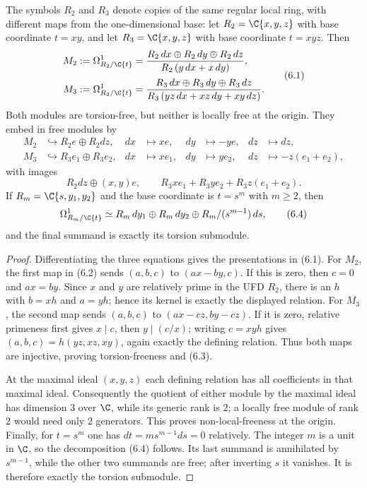 \begin{proposition}
\label{prop:relative-local}
The symbols $R_2$ and $R_3$ denote copies of the same regular local ring,
with different maps from the one-dimensional base:
let $R_2=\C\{x,y,z\}$ with base coordinate $t=xy$, and let
$R_3=\C\{x,y,z\}$ with base coordinate $t=xyz$.  Then
\[
\begin{aligned}
 M_2&:=\Omega^1_{R_2/\C\{t\}}
 =\frac{R_2\,dx\oplus R_2\,dy\oplus R_2\,dz}
        {R_2\,(y\,dx+x\,dy)},\\[2pt]
 M_3&:=\Omega^1_{R_3/\C\{t\}}
 =\frac{R_3\,dx\oplus R_3\,dy\oplus R_3\,dz}
        {R_3\,(yz\,dx+xz\,dy+xy\,dz)}.
\end{aligned}
\tag{6.1}
\]
Both modules are torsion-free, but neither is locally free at the origin.
They embed in free modules by
\[
\begin{aligned}
 M_2&\hookrightarrow R_2e\oplus R_2dz,
 &dx&\longmapsto xe,&dy&\longmapsto-ye,&dz&\longmapsto dz,\\
 M_3&\hookrightarrow R_3e_1\oplus R_3e_2,
 &dx&\longmapsto xe_1,&dy&\longmapsto ye_2,&dz&\longmapsto-z(e_1+e_2),
\end{aligned}
\tag{6.2}
\]
with images
\[
 R_2dz\oplus (x,y)e,
 \qquad
 R_3xe_1+R_3ye_2+R_3z(e_1+e_2).
\tag{6.3}
\]
If $R_m=\C\{s,y_1,y_2\}$ and the base coordinate is $t=s^m$ with
$m\ge2$, then
\[
\Omega^1_{R_m/\C\{t\}}
\simeq R_m\,dy_1\oplus R_m\,dy_2
       \oplus R_m/(s^{m-1})\,ds,
\tag{6.4}
\]
and the final summand is exactly its torsion submodule.
\end{proposition}

\begin{proof}
Differentiating the three equations gives the presentations in (6.1).  For
$M_2$, the first map in (6.2) sends $(a,b,c)$ to $(ax-by,c)$.  If this is
zero, then $c=0$ and $ax=by$.  Since $x$ and $y$ are relatively prime in the
UFD $R_2$, there is an $h$ with $b=xh$ and $a=yh$; hence its kernel is exactly
the displayed relation.  For $M_3$, the second map sends $(a,b,c)$ to
$(ax-cz,by-cz)$.  If it is zero, relative primeness first gives $x\mid c$,
then $y\mid(c/x)$; writing $c=xyh$ gives
$(a,b,c)=h(yz,xz,xy)$, again exactly the defining relation.  Thus both maps
are injective, proving torsion-freeness and (6.3).

At the maximal ideal $(x,y,z)$ each defining relation has all coefficients in
that maximal ideal.  Consequently the quotient of either module by the
maximal ideal has dimension $3$ over $\C$, while its generic rank is $2$;
a locally free module of rank $2$ would need only $2$ generators.  This proves
non-local-freeness at the origin.  Finally, for $t=s^m$ one has
$dt=m s^{m-1}ds=0$ relatively.  The integer $m$ is a unit in $\C$, so the
decomposition (6.4) follows.  Its last summand is annihilated by
$s^{m-1}$, while the other two summands are free; after inverting $s$ it
vanishes.  It is therefore exactly the torsion submodule.
\end{proof}

